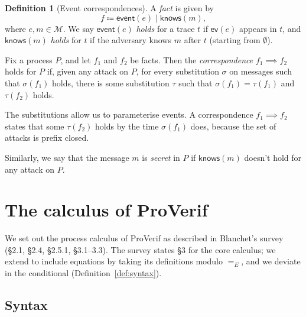 \documentclass[11pt]{article}
\theoremstyle{definition}
\newtheorem{definition}{Definition}[section]
\theoremstyle{plain}
\theoremstyle{remark}
\begin{document}
\begin{definition}[Event correspondences]
A \textit{fact} is given by
\[f\Coloneqq\mathsf{event}(e)\mid\mathsf{knows}(m),\]
where $e,m\in\mathcal{M}$. We say $\mathsf{event}(e)$ \textit{holds} for a trace $t$ if $\mathsf{ev}(e)$ appears in $t$, and $\mathsf{knows}(m)$ \textit{holds} for $t$ if the adversary knows $m$ after $t$ (starting from $\emptyset$).

Fix a process $P$, and let $f_1$ and $f_2$ be facts. Then the \textit{correspondence} $f_1\implies f_2$ holds for $P$ if, given any attack on $P$, for every substitution $\sigma$ on messages such that $\sigma(f_1)$ holds, there is some substitution $\tau$ such that $\sigma(f_1)=\tau(f_1)$ and $\tau(f_2)$ holds.
\end{definition}

The substitutions allow us to parameterise events. A correspondence $f_1\implies f_2$ states that some $\tau(f_2)$ holds by the time $\sigma(f_1)$ does, because the set of attacks is prefix closed.

Similarly, we say that the message $m$ is \textit{secret} in $P$ if $\mathsf{knows}(m)$ doesn't hold for any attack on $P$.

\section{The calculus of ProVerif}

We set out the process calculus of ProVerif as described in Blanchet's survey (\S2.1, \S2.4, \S2.5.1, \S3.1--3.3). The survey states \S3 for the core calculus; we extend to include equations by taking its definitions modulo $=_E$, and we deviate in the conditional (Definition~\ref{def:syntax}).

\subsection{Syntax}
\end{document}
